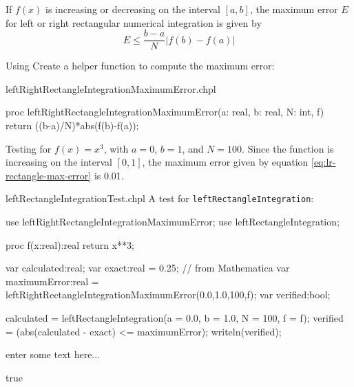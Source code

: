 If $f(x)$ is increasing or decreasing on the interval $[a,b]$, the maximum error $E$ 
for left or right rectangular numerical integration is given by
\begin{equation}
E \leq \frac{b-a}{N}\left|f(b)-f(a)\right| \label{eq:lr-rectangle-max-error}
\end{equation}

\begin{enumspec}
\item{}
Using Create a helper function to compute the maximum error: 
\end{enumspec}

\begin{chapelhelper}{leftRightRectangleIntegrationMaximumError.chpl}
\begin{chapel}
proc leftRightRectangleIntegrationMaximumError(a: real, b: real, N: int, f){
  return ((b-a)/N)*abs(f(b)-f(a));
}
\end{chapel}
\end{chapelhelper}

\begin{enumspec}
\item{}
Testing for $f(x) = x^3$, with $a=0$, $b=1$, and $N=100$.
Since the function is increasing on the interval $[0,1]$, 
the maximum error given by equation \ref{eq:lr-rectangle-max-error} is 0.01.  
\end{enumspec}

\begin{chapelexample}{leftRectangleIntegrationTest.chpl}
A test for \lstinline{leftRectangleIntegration}:
\begin{chapelpre}
use leftRightRectangleIntegrationMaximumError;
use leftRectangleIntegration;
\end{chapelpre}
\begin{chapel}
proc f(x:real):real {
  return x**3;
} 
  
var calculated:real;
var exact:real = 0.25;  // from Mathematica
var maximumError:real = leftRightRectangleIntegrationMaximumError(0.0,1.0,100,f);
var verified:bool;

calculated = leftRectangleIntegration(a = 0.0, b = 1.0, N = 100, f = f);
verified = (abs(calculated - exact) <= maximumError);
writeln(verified);
\end{chapel}
enter some text here...
\begin{chapelpost}
\end{chapelpost}
\begin{chapeloutput}
true
\end{chapeloutput}
\end{chapelexample}

